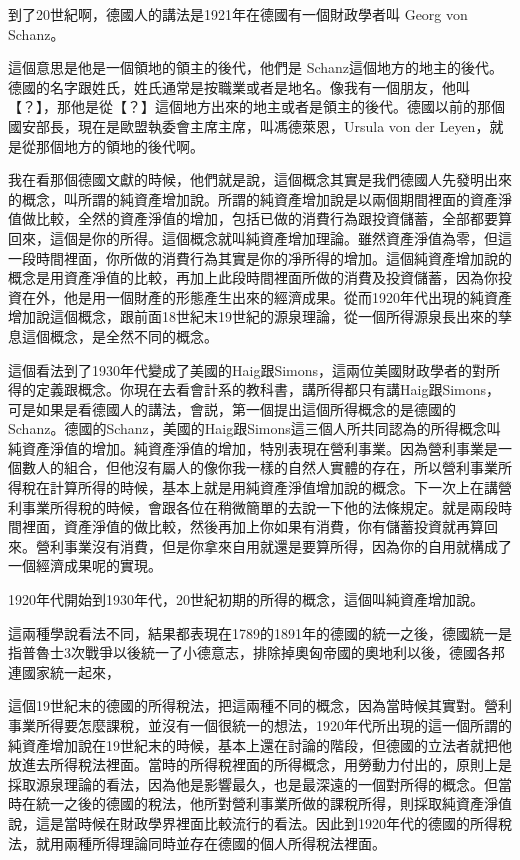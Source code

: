 \documentclass[]{ctexbook}
\begin{document}
到了20世紀啊，德國人的講法是1921年在德國有一個財政學者叫 Georg von Schanz。

這個意思是他是一個領地的領主的後代，他們是 Schanz這個地方的地主的後代。德國的名字跟姓氏，姓氏通常是按職業或者是地名。像我有一個朋友，他叫【？】，那他是從【？】這個地方出來的地主或者是領主的後代。德國以前的那個國安部長，現在是歐盟執委會主席主席，叫馮德萊恩，Ursula von der Leyen，就是從那個地方的領地的後代啊。

我在看那個德國文獻的時候，他們就是說，這個概念其實是我們德國人先發明出來的概念，叫所謂的純資產增加說。所謂的純資產增加說是以兩個期間裡面的資產淨值做比較，全然的資產淨值的增加，包括已做的消費行為跟投資儲蓄，全部都要算回來，這個是你的所得。這個概念就叫純資產增加理論。雖然資產淨值為零，但這一段時間裡面，你所做的消費行為其實是你的凈所得的增加。這個純資產增加說的概念是用資產凈值的比較，再加上此段時間裡面所做的消費及投資儲蓄，因為你投資在外，他是用一個財產的形態產生出來的經濟成果。從而1920年代出現的純資產增加說這個概念，跟前面18世紀末19世紀的源泉理論，從一個所得源泉長出來的孳息這個概念，是全然不同的概念。

這個看法到了1930年代變成了美國的Haig跟Simons，這兩位美國財政學者的對所得的定義跟概念。你現在去看會計系的教科書，講所得都只有講Haig跟Simons，可是如果是看德國人的講法，會説，第一個提出這個所得概念的是德國的Schanz。德國的Schanz，美國的Haig跟Simons這三個人所共同認為的所得概念叫純資產淨值的增加。純資產淨值的增加，特別表現在營利事業。因為營利事業是一個數人的組合，但他沒有屬人的像你我一樣的自然人實體的存在，所以營利事業所得稅在計算所得的時候，基本上就是用純資產淨值增加說的概念。下一次上在講營利事業所得稅的時候，會跟各位在稍微簡單的去說一下他的法條規定。就是兩段時間裡面，資產淨值的做比較，然後再加上你如果有消費，你有儲蓄投資就再算回來。營利事業沒有消費，但是你拿來自用就還是要算所得，因為你的自用就構成了一個經濟成果呢的實現。

1920年代開始到1930年代，20世紀初期的所得的概念，這個叫純資產增加說。

這兩種學說看法不同，結果都表現在1789的1891年的德國的統一之後，德國統一是指普魯士3次戰爭以後統一了小德意志，排除掉奧匈帝國的奧地利以後，德國各邦連國家統一起來，

這個19世紀末的德國的所得稅法，把這兩種不同的概念，因為當時候其實對。營利事業所得要怎麼課稅，並沒有一個很統一的想法，1920年代所出現的這一個所謂的純資產增加說在19世紀末的時候，基本上還在討論的階段，但德國的立法者就把他放進去所得稅法裡面。當時的所得稅裡面的所得概念，用勞動力付出的，原則上是採取源泉理論的看法，因為他是影響最久，也是最深遠的一個對所得的概念。但當時在統一之後的德國的稅法，他所對營利事業所做的課稅所得，則採取純資產淨值說，這是當時候在財政學界裡面比較流行的看法。因此到1920年代的德國的所得稅法，就用兩種所得理論同時並存在德國的個人所得稅法裡面。
\end{document}
